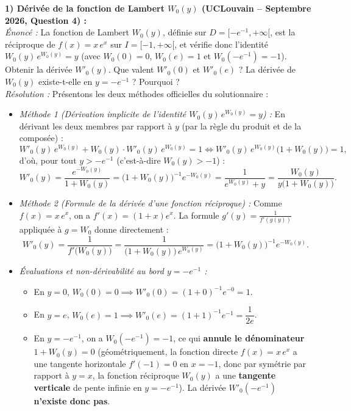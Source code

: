 \begin{exemple}
\textbf{1) Dérivée de la fonction de Lambert $W_0(y)$ (UCLouvain -- Septembre 2026, Question 4) :}\\
\emph{Énoncé :} La fonction de Lambert $W_0(y)$, définie sur $D = [-e^{-1}, +\infty[$, est la réciproque de $f(x) = x\,e^x$ sur $I = [-1, +\infty[$, et vérifie donc l'identité $W_0(y)\,e^{W_0(y)} = y$ (avec $W_0(0) = 0$, $W_0(e) = 1$ et $W_0(-e^{-1}) = -1$). Obtenir la dérivée $W'_0(y)$. Que valent $W'_0(0)$ et $W'_0(e)$ ? La dérivée de $W_0(y)$ existe-t-elle en $y = -e^{-1}$ ? Pourquoi ?\\
\emph{Résolution :} Présentons les deux méthodes officielles du solutionnaire :
\begin{itemize}
    \item \emph{Méthode 1 (Dérivation implicite de l'identité $W_0(y)\,e^{W_0(y)} = y$) :} En dérivant les deux membres par rapport à $y$ (par la règle du produit et de la composée) :
    \[
        W'_0(y)\,e^{W_0(y)} + W_0(y)\cdot W'_0(y)\,e^{W_0(y)} = 1 \iff W'_0(y)\,e^{W_0(y)}\bigl(1 + W_0(y)\bigr) = 1,
    \]
    d'où, pour tout $y > -e^{-1}$ (c'est-à-dire $W_0(y) > -1$) :
    \[
        \boxed{W'_0(y) = \frac{e^{-W_0(y)}}{1 + W_0(y)} = \bigl(1 + W_0(y)\bigr)^{-1} e^{-W_0(y)}} = \frac{1}{e^{W_0(y)} + y} = \frac{W_0(y)}{y\bigl(1+W_0(y)\bigr)}.
    \]
    \item \emph{Méthode 2 (Formule de la dérivée d'une fonction réciproque) :} Comme $f(x) = x\,e^x$, on a $f'(x) = (1+x)e^x$. La formule $g'(y) = \frac{1}{f'(g(y))}$ appliquée à $g = W_0$ donne directement :
    \[
        W'_0(y) = \frac{1}{f'\bigl(W_0(y)\bigr)} = \frac{1}{\bigl(1 + W_0(y)\bigr)\,e^{W_0(y)}} = \bigl(1 + W_0(y)\bigr)^{-1} e^{-W_0(y)}.
    \]
    \item \emph{Évaluations et non-dérivabilité au bord $y = -e^{-1}$ :}
    \begin{itemize}
        \item En $y = 0$, $W_0(0) = 0 \implies W'_0(0) = (1+0)^{-1}e^{-0} = \boxed{1}$.
        \item En $y = e$, $W_0(e) = 1 \implies W'_0(e) = (1+1)^{-1}e^{-1} = \boxed{\dfrac{1}{2e}}$.
        \item En $y = -e^{-1}$, on a $W_0(-e^{-1}) = -1$, ce qui \textbf{annule le dénominateur} $1 + W_0(y) = 0$ (géométriquement, la fonction directe $f(x) = x\,e^x$ a une tangente horizontale $f'(-1) = 0$ en $x = -1$, donc par symétrie par rapport à $y = x$, la fonction réciproque $W_0(y)$ a une \textbf{tangente verticale} de pente infinie en $y = -e^{-1}$). La dérivée $W'_0(-e^{-1})$ \textbf{n'existe donc pas}.
    \end{itemize}
\end{itemize}


\end{exemple}
